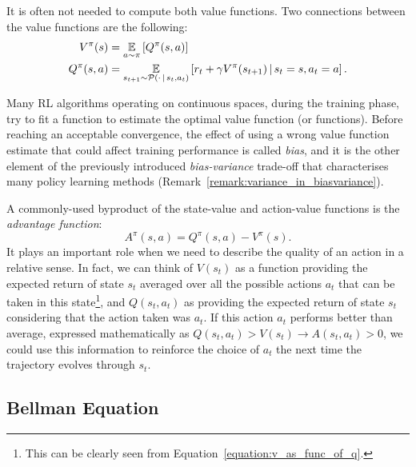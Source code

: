It is often not needed to compute both value functions.
Two connections between the value functions are the following:
%
\begin{align}
    V^\pi(s) &= \operatorname*{\mathbb{E}}_{a \sim \pi} \left[ Q^\pi(s, a) \right] \label{equation:v_as_func_of_q}\\
    Q^\pi(s, a) &= \operatorname*{\mathbb{E}}_{s_{t+1} \sim \mathcal{P}(\cdot \operatorname{\mid} s_t, a_t)} \left[ r_t + \gamma V^\pi(s_{t+1}) \operatorname{\mid} s_t=s, a_t=a \right] \label{equation:q_as_func_of_v}
    .
\end{align}

\begin{remark*}
\label{remark:bias_in_biasvariance}
%
Many \ac{RL} algorithms operating on continuous spaces, during the training phase, try to fit a function to estimate the optimal value function (or functions).
Before reaching an acceptable convergence, the effect of using a wrong value function estimate that could affect training performance is called \emph{bias}, and it is the other element of the previously introduced \emph{bias-variance} trade-off that characterises many policy learning methods (Remark~\ref{remark:variance_in_biasvariance}).
%
\end{remark*}

A commonly-used byproduct of the state-value and action-value functions is the \emph{advantage function}:
%
\begin{equation}
    \label{equation:advantage_function}
    A^\pi(s, a) = Q^\pi(s, a) - V^\pi(s) .
\end{equation}
%
It plays an important role when we need to describe the quality of an action in a relative sense.
In fact, we can think of $V(s_t)$ as a function providing the expected return of state $s_t$ averaged over all the possible actions $a_t$ that can be taken in this state\footnote{This can be clearly seen from Equation~\eqref{equation:v_as_func_of_q}.}, and $Q(s_t, a_t)$ as providing the expected return of state $s_t$ considering that the action taken was $a_t$.
If this action $a_t$ performs better than average, expressed mathematically as $Q(s_t, a_t) > V(s_t) \rightarrow A(s_t, a_t) > 0$, we could use this information to reinforce the choice of $a_t$ the next time the trajectory evolves through $s_t$.

\subsection{Bellman Equation}
\label{section:bellman_equation}

